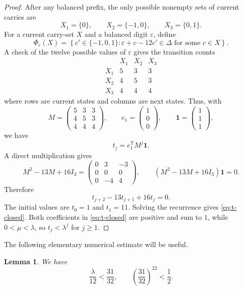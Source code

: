 \documentclass[11pt,reqno]{amsart}
\theoremstyle{plain}
\newtheorem{lemma}[theorem]{Lemma}
\theoremstyle{definition}
\theoremstyle{remark}
\theoremstyle{named}
\newcommand{\one}{\mathbf 1}
\begin{document}
\begin{proof}
After any balanced prefix, the only possible nonempty sets of current carries
are
\[
 X_1=\{0\},
 \qquad
 X_2=\{-1,0\},
 \qquad
 X_3=\{0,1\}.
\]
For a current carry-set $X$ and a balanced digit $\varepsilon$, define
\[
 \Phi_\varepsilon(X)=
 \left\{
 c'\in\{-1,0,1\}:
 \varepsilon+c-12c'\in\Delta
 \text{ for some }c\in X
 \right\}.
\]
A check of the twelve possible values of $\varepsilon$ gives the transition
counts
\begin{equation}\label{eq:transition-table}
\begin{array}{c|ccc}
 &X_1&X_2&X_3\\ \hline
 X_1&5&3&3\\
 X_2&4&5&3\\
 X_3&4&4&4
\end{array}
\end{equation}
where rows are current states and columns are next states.  Thus, with
\[
 M=
 \begin{pmatrix}
 5&3&3\\
 4&5&3\\
 4&4&4
 \end{pmatrix},
 \qquad
 e_1=\begin{pmatrix}1\\0\\0\end{pmatrix},
 \qquad
 \one=\begin{pmatrix}1\\1\\1\end{pmatrix},
\]
we have
\[
 t_j=e_1^{\mathsf T}M^j\one.
\]
A direct multiplication gives
\[
 M^2-13M+16I_3
 =
 \begin{pmatrix}
 0&3&-3\\
 0&0&0\\
 0&-4&4
 \end{pmatrix},
 \qquad
 (M^2-13M+16I_3)\one=0.
\]
Therefore
\[
 t_{j+2}-13t_{j+1}+16t_j=0.
\]
The initial values are $t_0=1$ and $t_1=11$.  Solving the recurrence gives
\eqref{eq:t-closed}.  Both coefficients in \eqref{eq:t-closed} are positive
and sum to $1$, while $0<\mu<\lambda$, so $t_j<\lambda^j$ for $j\ge1$.
\end{proof}

The following elementary numerical estimate will be useful.

\begin{lemma}\label{lem:lambda-bound}
We have
\[
 \frac{\lambda}{12}<\frac{31}{32},
 \qquad
 \left(\frac{31}{32}\right)^{22}<\frac12.
\]
\end{lemma}
\end{document}
